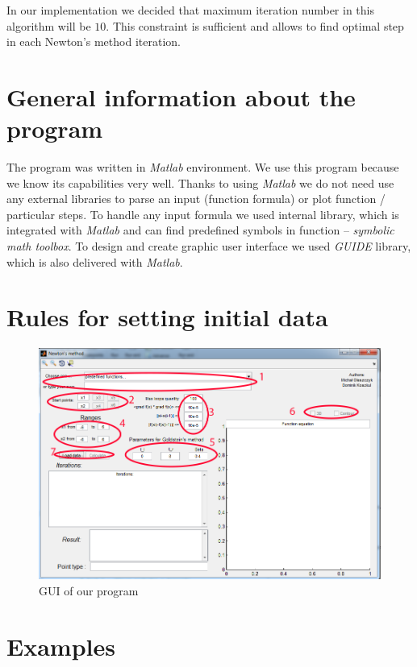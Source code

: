 \documentclass[12pt]{article}
\begin{document}
In our implementation we decided that maximum iteration number in this algorithm will be $10$. This constraint is sufficient and allows to find optimal step in each Newton's method iteration.

\section{General information about the program}
The program was written in \textit{Matlab} environment. We use this program because we know its capabilities very well. Thanks to using \textit{Matlab} we do not need use any external libraries to parse an input (function formula) or plot function / particular steps. To handle any input formula we used internal library, which is integrated with \textit{Matlab} and can find predefined symbols in function -- \textit{symbolic math toolbox}. To design and create graphic user interface we used \textit{GUIDE} library, which is also delivered with \textit{Matlab}.
\section{Rules for setting initial data}
\begin{figure}[H]
\begin{center}
\includegraphics[scale=0.3]{images/program.png}
\caption{GUI of our program}
\label{program}
\end{center}		
\end{figure}


\vspace{3cm}

\section{Examples}
\end{document}
